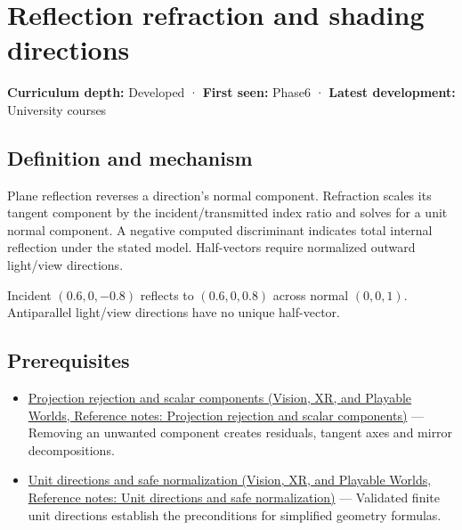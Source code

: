 \hypertarget{appendix-44e00863b4d5}{}\label{referencestart:appendix-44e00863b4d5}
\section{Reflection refraction and shading directions}\label{appendix-44e00863b4d5-reflection-refraction-and-shading-directions}

\hypertarget{appendix-44e00863b4d5-reflection-refraction-and-shading-directions}{}

\textbf{Curriculum depth:} Developed · \textbf{First seen:} Phase6 · \textbf{Latest development:} University courses

\begin{allmightroledefinition}

\subsection{Definition and mechanism}\label{appendix-44e00863b4d5-definition-and-mechanism}

\hypertarget{appendix-44e00863b4d5-definition-and-mechanism}{}

Plane reflection reverses a direction's normal component. Refraction scales its tangent component by the incident/transmitted index ratio and solves for a unit normal component. A negative computed discriminant indicates total internal reflection under the stated model. Half-vectors require normalized outward light/view directions.

\end{allmightroledefinition}

Incident \((0.6,0,-0.8)\) reflects to \((0.6,0,0.8)\) across normal \((0,0,1)\). Antiparallel light/view directions have no unique half-vector.

\subsection{Prerequisites}\label{appendix-44e00863b4d5-prerequisites}

\hypertarget{appendix-44e00863b4d5-prerequisites}{}

\begin{itemize}
\tightlist
\item
  \href{../07-Vision-XR-and-Playable-Worlds/main.pdf\#nameddest=appendix-505a502c372a}{Projection rejection and scalar components (Vision, XR, and Playable Worlds, Reference notes: Projection rejection and scalar components)} --- Removing an unwanted component creates residuals, tangent axes and mirror decompositions.
\item
  \href{../07-Vision-XR-and-Playable-Worlds/main.pdf\#nameddest=appendix-f744e41b95b4}{Unit directions and safe normalization (Vision, XR, and Playable Worlds, Reference notes: Unit directions and safe normalization)} --- Validated finite unit directions establish the preconditions for simplified geometry formulas.
\end{itemize}

